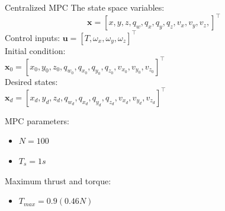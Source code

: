\documentclass{thesisbeamer}
\begin{document}
\begin{frame}[t]{Centralized MPC}
    The state space variables:
    \begin{equation}
        \bm{x}= [x, y, z, q_w, q_x, q_y, q_z, v_x, v_y, v_z, ]^{\intercal}
    \end{equation} 
    \vfill
    Control inputs: 
    $\bm{u} = [T, \omega_x, \omega_y, \omega_z]^{\intercal}$\\
    \vfill
    Initial condition: \\
    $\bm{x}_0 = [ x_0, y_0, z_0, q_{w_0}, q_{x_0}, q_{y_0}, q_{z_0}, v_{x_0}, v_{y_0}, v_{z_0}]^{\intercal}$\\
    \vfill
    Desired states: \\
    $\bm{x}_d = [x_d,y_d,z_d, q_{w_d}, q_{x_d}, q_{y_d}, q_{z_d}, v_{x_d}, v_{y_d}, v_{z_d}]^{\intercal}$
    
    \vfill
    MPC parameters: 
    \begin{itemize}
        \item $N = 100$
        \item $T_s = 1s$
    \end{itemize}
    
    Maximum thrust and torque:
    	\begin{itemize}
        	\item $T_{max} = 0.9 (0.46 N)$
        \end{itemize}
\end{frame}
\end{document}
